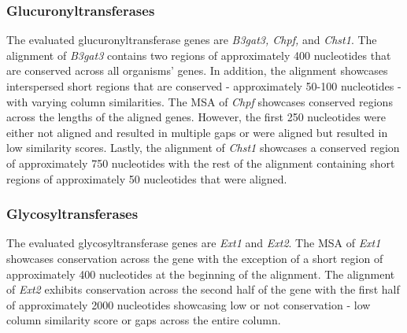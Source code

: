 \documentclass{article}
\begin{document}
\subsubsection*{Glucuronyltransferases}
The evaluated glucuronyltransferase genes are \textit{B3gat3, Chpf,} and \textit{Chst1}. The alignment of \textit{B3gat3} contains two regions of approximately 400 nucleotides that are conserved across all organisms' genes. In addition, the alignment showcases interspersed short regions that are conserved - approximately 50-100 nucleotides - with varying column similarities. The MSA of \textit{Chpf} showcases conserved regions across the lengths of the aligned genes. However, the first 250 nucleotides were either not aligned and resulted in multiple gaps or were aligned but resulted in low similarity scores. Lastly, the alignment of \textit{Chst1} showcases a conserved region of approximately 750 nucleotides with the rest of the alignment containing short regions of approximately 50 nucleotides that were aligned.

\subsubsection*{Glycosyltransferases}
The evaluated glycosyltransferase genes are \textit{Ext1} and \textit{Ext2}. The MSA of \textit{Ext1} showcases conservation across the gene with the exception of a short region of approximately 400 nucleotides at the beginning of the alignment. The alignment of \textit{Ext2} exhibits conservation across the second half of the gene with the first half of approximately 2000 nucleotides showcasing low or not conservation - low column similarity score or gaps across the entire column.
\end{document}
